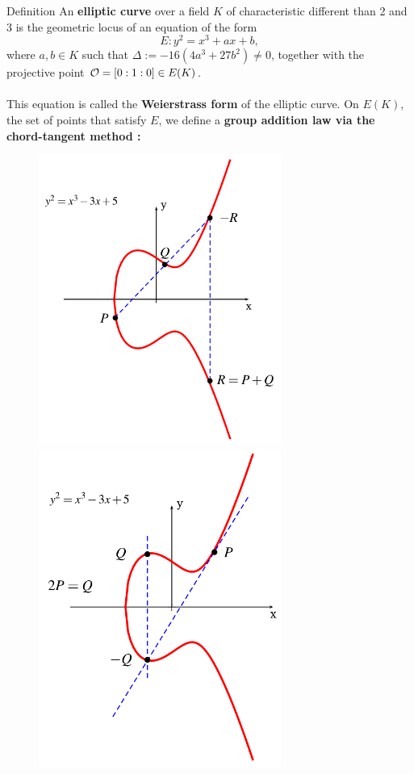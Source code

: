 \documentclass{beamer}
\begin{document}
\begin{frame}{}
\begin{columns}[t]
\begin{column}{0.245\linewidth}
\begin{block}{Definition}
An \textbf{elliptic curve}  over a field $K$ of characteristic different than 2 and 3 is 
the geometric locus of an equation of the form
$$E : y^2 = x^3+ax+b,$$
where $a, b \in K$ such that $\Delta := -16 (4 a^3 + 27 b^2) \neq 0$,
together with the projective point ${\cal{O}} =  [0:1:0] \in E(K)$.\\
\\
This equation is called the \textbf{Weierstrass form} of the elliptic curve.
On $E(K)$, the set of points that satisfy $E$, we define a \textbf{group addition law via the chord-tangent method :}\\
\begin{figure}[p]
    \includegraphics[scale=1.2]{PQ}
     \includegraphics[scale=1.2]{2P}
\end{figure}
\end{block} 



\end{column}
\end{columns}
\end{frame}
\end{document}
